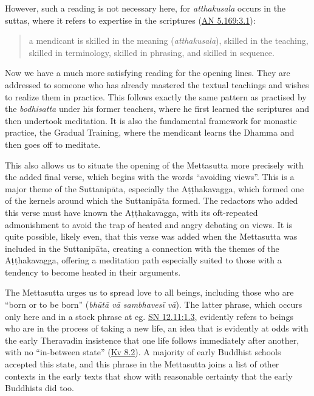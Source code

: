 \documentclass[12pt,openany]{book}%
\begin{document}
However, such a reading is not necessary here, for \textit{atthakusala} occurs in the suttas, where it refers to expertise in the scriptures (\href{https://suttacentral.net/an5.169/en/sujato\#3.1}{AN 5.169:3.1}):

\begin{quotation}%
a mendicant is skilled in the meaning (\textit{atthakusala}), skilled in the teaching, skilled in terminology, skilled in phrasing, and skilled in sequence.

%
\end{quotation}

Now we have a much more satisfying reading for the opening lines. They are addressed to someone who has already mastered the textual teachings and wishes to realize them in practice. This follows exactly the same pattern as practised by the \textit{bodhisatta} under his former teachers, where he first learned the scriptures and then undertook meditation. It is also the fundamental framework for monastic practice, the Gradual Training, where the mendicant learns the Dhamma and then goes off to meditate.

This also allows us to situate the opening of the Mettasutta more precisely with the added final verse, which begins with the words “avoiding views”. This is a major theme of the \textsanskrit{Suttanipāta}, especially the \textsanskrit{Aṭṭhakavagga}, which formed one of the kernels around which the \textsanskrit{Suttanipāta} formed. The redactors who added this verse must have known the \textsanskrit{Aṭṭhakavagga}, with its oft-repeated admonishment to avoid the trap of heated and angry debating on views. It is quite possible, likely even, that this verse was added when the Mettasutta was included in the \textsanskrit{Suttanipāta}, creating a connection with the themes of the \textsanskrit{Aṭṭhakavagga}, offering a meditation path especially suited to those with a tendency to become heated in their arguments.

The Mettasutta urges us to spread love to all beings, including those who are “born or to be born” (\textit{\textsanskrit{bhūtā} \textsanskrit{vā} \textsanskrit{sambhavesī} \textsanskrit{vā}}). The latter phrase, which occurs only here and in a stock phrase at eg. \href{https://suttacentral.net/sn12.11/en/sujato\#1.3}{SN 12.11:1.3}, evidently refers to beings who are in the process of taking a new life, an idea that is evidently at odds with the early Theravadin insistence that one life follows immediately after another, with no “in-between state” (\href{https://suttacentral.net/kv8.2}{Kv 8.2}). A majority of early Buddhist schools accepted this state, and this phrase in the Mettasutta joins a list of other contexts in the early texts that show with reasonable certainty that the early Buddhists did too.
\end{document}
